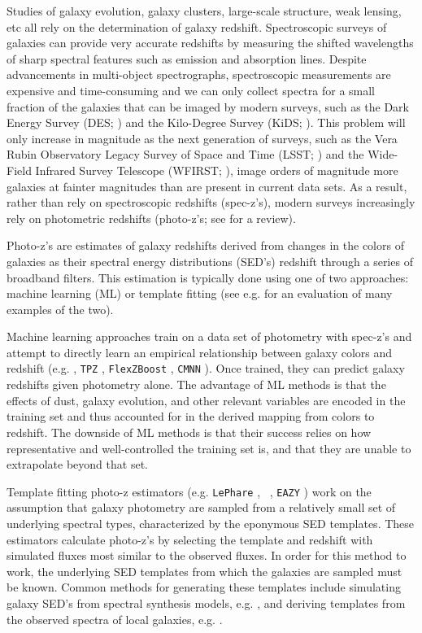 
Studies of galaxy evolution, galaxy clusters, large-scale structure, weak lensing, etc all rely on the determination of galaxy redshift.
Spectroscopic surveys of galaxies can provide very accurate redshifts by measuring the shifted wavelengths of sharp spectral features such as emission and absorption lines.
Despite advancements in multi-object spectrographs, spectroscopic measurements are expensive and time-consuming and we can only collect spectra for a small fraction of the galaxies that can be imaged by  modern surveys, such as the Dark Energy Survey (DES; \citealt{TheDarkEnergySurveyCollaboration2005}) and the Kilo-Degree Survey (KiDS; \citealt{DeJong2013a}).
This problem will only increase in magnitude as the next generation of surveys, such as the Vera Rubin Observatory Legacy Survey of Space and Time (LSST; \citealt{LSSTScienceCollaboration2009}) and the Wide-Field Infrared Survey Telescope (WFIRST; \citealt{Green2012}), image orders of magnitude more galaxies at fainter magnitudes than are present in current data sets.
As a result, rather than rely on spectroscopic redshifts (spec-z's), modern surveys increasingly rely on photometric redshifts (photo-z's; see \citealt{Salvato2019} for a review).

Photo-z's are estimates of galaxy redshifts derived from changes in the colors of galaxies as their spectral energy distributions (SED's) redshift through a series of broadband filters.
This estimation is typically done using one of two approaches: machine learning (ML) or template fitting (see e.g. \citealt{Schmidt2020} for an evaluation of many examples of the two).

Machine learning approaches train on a data set of photometry with spec-z's and attempt to directly learn an empirical relationship between galaxy colors and redshift (e.g. \citealt{Connolly1995}, \texttt{TPZ} \citealt{Kind2013}, \texttt{FlexZBoost} \citealt{Izbicki2017}, \texttt{CMNN} \citealt{Graham2018a}).
Once trained, they can predict galaxy redshifts given photometry alone.
The advantage of ML methods is that the effects of dust, galaxy evolution, and other relevant variables are encoded in the training set and thus accounted for in the derived mapping from colors to redshift.
The downside of ML methods is that their success relies on how representative and well-controlled the training set is, and that they are unable to extrapolate beyond that set.

Template fitting photo-z estimators (e.g. \texttt{LePhare} \citealt{Arnouts1999}, \bpz\ \citealt{Benitez2000a}, \texttt{EAZY} \citealt{Brammer2008}) work on the assumption that galaxy photometry are sampled from a relatively small set of underlying spectral types, characterized by the eponymous SED templates. 
These estimators calculate photo-z's by selecting the template and redshift with simulated fluxes most similar to the observed fluxes. 
In order for this method to work, the underlying SED templates from which the galaxies are sampled must be known. 
Common methods for generating these templates include simulating galaxy SED's from spectral synthesis models, e.g. \citet{BruzualA.1993a}, and deriving templates from the observed spectra of local galaxies, e.g. \citet{Benitez2004a}. 

